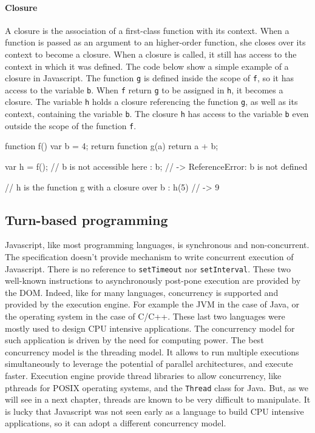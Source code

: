\paragraph{Closure}

A closure is the association of a first-class function with its context.
When a function is passed as an argument to an higher-order function, she closes over its context to become a closure.
When a closure is called, it still has access to the context in which it was defined.
The code below show a simple example of a closure in Javascript.
The function \texttt{g} is defined inside the scope of \texttt{f}, so it has access to the variable \texttt{b}.
When \texttt{f} return \texttt{g} to be assigned in \texttt{h}, it becomes a closure.
The variable \texttt{h} holds a closure referencing the function \texttt{g}, as well as its context, containing the variable \texttt{b}.
The closure \texttt{h} has access to the variable \texttt{b} even outside the scope of the function \texttt{f}.

\begin{code}
  function f() {
    var b = 4;
    return function g(a) {
      return a + b;
    }
  }

  var h = f();
  // b is not accessible here :
  b; // -> ReferenceError: b is not defined

  // h is the function g with a closure over b :
  h(5) // -> 9
\end{code}






\subsection{Turn-based programming}

Javascript, like most programming languages, is synchronous and non-concurrent. The specification doesn't provide mechanism to write concurrent execution of Javascript.
There is no reference to \texttt{setTimeout} nor \texttt{setInterval}.
These two well-known instructions to asynchronously post-pone execution are provided by the DOM.
Indeed, like for many languages, concurrency is supported and provided by the execution engine.
For example the JVM in the case of Java, or the operating system in the case of C/C++.
These last two languages were mostly used to design CPU intensive applications.
The concurrency model for such application is driven by the need for computing power.
The best concurrency model is the threading model.
It allows to run multiple executions simultaneously to leverage the potential of parallel architectures, and execute faster.
Execution engine provide thread libraries to allow concurrency, like pthreads for POSIX operating systems, and the \texttt{Thread} class for Java.
But, as we will see in a next chapter, threads are known to be very difficult to manipulate.
It is lucky that Javascript was not seen early as a language to build CPU intensive applications, so it can adopt a different concurrency model.

